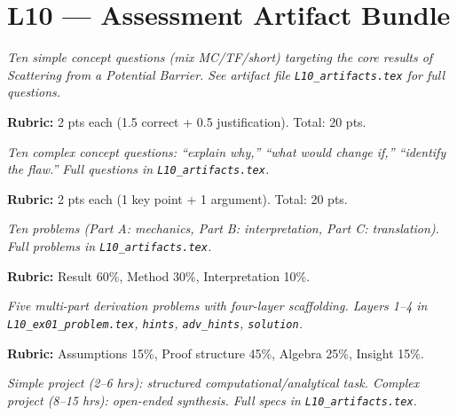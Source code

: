 \newpage
\section*{L10 — Assessment Artifact Bundle}

\begin{tcolorbox}[ugconceptbox, title={SCQU · L10 · Tiers 1–3 · 15–20 min}]
\textit{Ten simple concept questions (mix MC/TF/short) targeting the core results
of Scattering from a Potential Barrier. See artifact file \texttt{L10_artifacts.tex} for full questions.}

\textbf{Rubric:} 2 pts each (1.5 correct + 0.5 justification). Total: 20 pts.
\end{tcolorbox}

\begin{tcolorbox}[ugconceptbox, title={CCQU · L10 · Tiers 2–3 · 25–35 min}]
\textit{Ten complex concept questions: ``explain why,'' ``what would change if,''
``identify the flaw.'' Full questions in \texttt{L10_artifacts.tex}.}

\textbf{Rubric:} 2 pts each (1 key point + 1 argument). Total: 20 pts.
\end{tcolorbox}

\begin{tcolorbox}[ugprobbox, title={SPSU · L10 · Tiers 1–3 · 60–90 min}]
\textit{Ten problems (Part A: mechanics, Part B: interpretation, Part C: translation).
Full problems in \texttt{L10_artifacts.tex}.}

\textbf{Rubric:} Result 60\%, Method 30\%, Interpretation 10\%.
\end{tcolorbox}

\begin{tcolorbox}[ugprobbox, title={CPSU · L10 · Tier 3 · 3–6 hrs (4-layer)}]
\textit{Five multi-part derivation problems with four-layer scaffolding.
Layers 1–4 in \texttt{L10_ex01\_problem.tex}, \texttt{hints}, \texttt{adv\_hints}, \texttt{solution}.}

\textbf{Rubric:} Assumptions 15\%, Proof structure 45\%, Algebra 25\%, Insight 15\%.
\end{tcolorbox}

\begin{tcolorbox}[ugprobbox, title={SPJU + CPJU · L10 · Tiers 2–3}]
\textit{Simple project (2–6 hrs): structured computational/analytical task.
Complex project (8–15 hrs): open-ended synthesis.
Full specs in \texttt{L10_artifacts.tex}.}
\end{tcolorbox}

